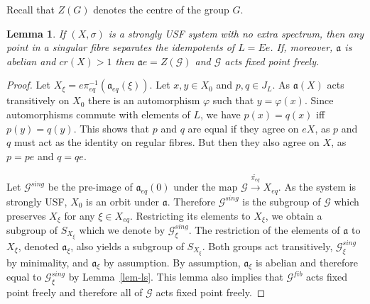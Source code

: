 \documentclass[12pt]{amsart}
\newtheorem{lemma}[theorem]{Lemma}
\theoremstyle{definition}
\numberwithin{equation}{section}
\newcommand{\Gg}{{\mathcal G}}
\newcommand{\Xe}{X_{eq}}
\newcommand{\aut}{{\mathfrak a}}
\newcommand{\aute}{\aut_{eq}}
\newcommand{\pe}{\pi_{eq}}
\newcommand{\tpe}{\widetilde{\pe}}
\begin{document}
Recall that $Z(G)$ denotes the centre of the group $G$.
\begin{lemma} \label{lem-trans} If $(X,\sigma)$ is a  strongly USF  system with no extra spectrum,
then any point in a  singular fibre separates the idempotents of $L=Ee$. 
If, moreover, $\aut$ is abelian 
and $cr(X)>1$ 
then $\aut e = Z(\Gg)$ and $\Gg$ acts fixed point freely. 
\end{lemma}
\begin{proof}
Let $X_\xi=  e\pe^{-1}( \aute (\xi))$. 
Let $x,y\in X_0$ and $p,q\in J_L$. As $\aut(X)$ acts transitively on $X_0$ there is an automorphism $\varphi$ such that $y=\varphi(x)$. Since automorphisms commute with elements of $L$, we have $p(x)=q(x)$ iff $p(y)=q(y)$. This shows that $p$ and $q$ are equal if they agree on $eX$, as  $p$ and $q$ must act as the identity on regular fibres. But then they also agree on $X$, as $p = pe$ and $q=qe$.

Let $\Gg^{sing}$ be the pre-image of $\aute(0)$ under the map 
$\Gg\stackrel{\tpe}\to \Xe$.   
As the system is strongly USF,  ${X_0}$ is an orbit under $\aut$. Therefore $\Gg^{sing}$ is the subgroup of $\Gg$ which preserves 
$X_\xi$ for any $\xi\in \Xe$. 
Restricting its elements to $X_\xi$, we obtain a subgroup of $S_{X_\xi}$ which we denote by $\Gg^{sing}_\xi$. The restriction of the elements of $\aut$ to $X_\xi$, denoted $\aut_\xi$,  also yields  a subgroup of 
$S_{X_\xi}$. Both groups act transitively, $\Gg^{sing}_\xi$ by minimality, and $\aut_\xi$ by assumption. By assumption, $\aut_\xi$ is abelian and therefore equal to $\Gg^{sing}_\xi$ by Lemma~\ref{lem-ls}. This lemma also implies that $\Gg^{fib}$ acts fixed point freely and therefore all of $\Gg$ acts fixed point freely.



\end{proof}
\end{document}
